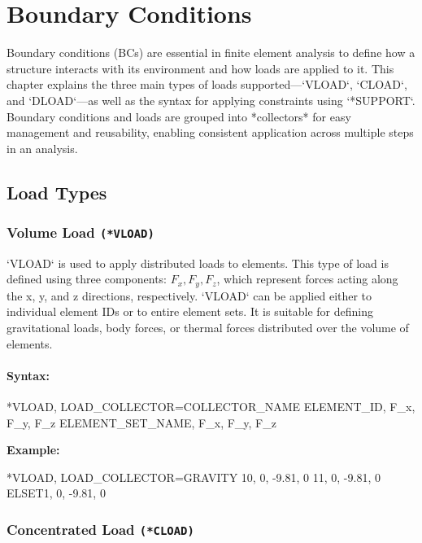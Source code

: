 \chapter{Boundary Conditions}
\label{chap:bc}

Boundary conditions (BCs) are essential in finite element analysis to define how a structure interacts with its environment and how loads are applied to it. This chapter explains the three main types of loads supported—`VLOAD`, `CLOAD`, and `DLOAD`—as well as the syntax for applying constraints using `*SUPPORT`. Boundary conditions and loads are grouped into *collectors* for easy management and reusability, enabling consistent application across multiple steps in an analysis.

\section{Load Types}

\subsection{Volume Load \texttt{(*VLOAD)}}

`VLOAD` is used to apply distributed loads to elements. This type of load is defined using three components: \( F_x, F_y, F_z \), which represent forces acting along the x, y, and z directions, respectively. `VLOAD` can be applied either to individual element IDs or to entire element sets. It is suitable for defining gravitational loads, body forces, or thermal forces distributed over the volume of elements.

\subsubsection{Syntax:}
\begin{codeBlock}
*VLOAD, LOAD_COLLECTOR=COLLECTOR_NAME
ELEMENT_ID, F_x, F_y, F_z
ELEMENT_SET_NAME, F_x, F_y, F_z
\end{codeBlock}

\textbf{Example:}
\begin{codeBlock}
*VLOAD, LOAD_COLLECTOR=GRAVITY
10, 0, -9.81, 0
11, 0, -9.81, 0
ELSET1, 0, -9.81, 0
\end{codeBlock}

\subsection{Concentrated Load \texttt{(*CLOAD)}}


